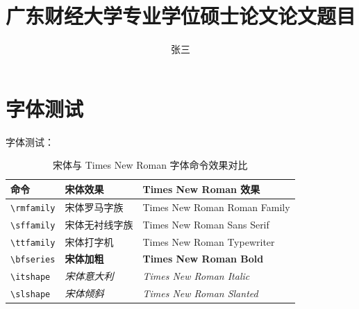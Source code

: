 \documentclass[class = academic, type=thesis, AutoFakeBold=3.17,AutoFakeSlant=0.2,12pt]{gdufe_master}
\title{广东财经大学专业学位硕士论文论文题目}
\author{张三}
\begin{document}
\frontmatter
\makecover
\maketitlepage
\makeclaim

\tableofcontents

\mainmatter

\section{字体测试}
字体测试：

\begin{table}[ht]\centering
    \begin{tabular}{lll}
        \toprule
        命令               & 宋体效果                & Times New Roman 效果                       \\
        \midrule
        \verb|\rmfamily| & {\rmfamily 宋体罗马字族}  & {\rmfamily Times New Roman Roman Family} \\
        \verb|\sffamily| & {\sffamily 宋体无衬线字族} & {\sffamily Times New Roman Sans Serif}   \\
        \verb|\ttfamily| & {\ttfamily 宋体打字机}   & {\ttfamily Times New Roman Typewriter}   \\
        \verb|\bfseries| & {\bfseries 宋体加粗}    & {\bfseries Times New Roman Bold}         \\
        \verb|\itshape|  & {\itshape 宋体意大利}    & {\itshape Times New Roman Italic}        \\
        \verb|\slshape|  & {\slshape 宋体倾斜}     & {\slshape Times New Roman Slanted}       \\
        \bottomrule
    \end{tabular}
    \caption{宋体与 Times New Roman 字体命令效果对比}
\end{table}
\end{document}
